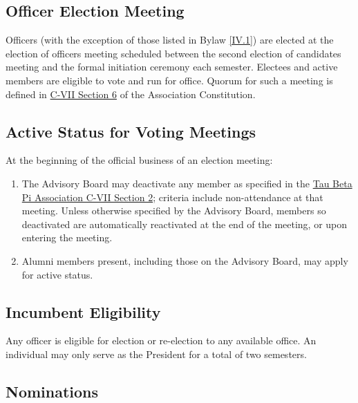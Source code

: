 \subsection{Officer Election Meeting} \label{II.1}

Officers (with the exception of those listed
in Bylaw \ref{IV.1}) are elected at the election of officers meeting scheduled between the second
election of candidates meeting and the formal initiation ceremony each semester. Electees
and active members are eligible to vote and run for office. Quorum for such a meeting is
defined in \href{http://www.tbp.org/off/ConstBylaw.pdf}{C-VII Section 6} of the Association Constitution.


\subsection{Active Status for Voting Meetings} \label{II.2}

At the beginning of the official
business of an election meeting:
\begin{enumerate}
    \item {} \label{II.2.a}
    The Advisory Board may deactivate any member as specified in the \href{http://www.tbp.org/off/ConstBylaw.pdf}{Tau Beta Pi Association
C-VII Section 2}; criteria include non-attendance at that meeting. Unless
otherwise specified by the Advisory Board, members so deactivated are automatically
reactivated at the end of the meeting, or upon entering the meeting.
    \item {} \label{II.2.b}
    Alumni members present, including those on the Advisory Board, may apply for
active status.
\end{enumerate}


\subsection{Incumbent Eligibility} \label{II.3}

Any officer is eligible for election or re-election
to any available office. An individual may only serve as the President for a total of two
semesters.


\subsection{Nominations} \label{II.4}

